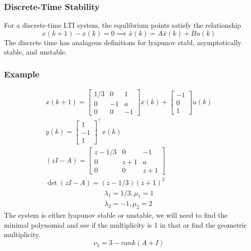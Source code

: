 \documentclass[11pt]{article}
\begin{document}
\subsubsection{Discrete-Time Stability}
For a discrete-time LTI system, the equilibrium points satisfy the relationship
\begin{equation}
  x(k+1) - x(k) = 0 \implies \bar{x}(k) = A\bar{x}(k) + Bu(k)
\end{equation}
The discrete time has analagous definitions for lyapunov stabl, asymptotically stable, and unstable.

\subsubsection{Example}
\begin{align}
  x(k+1) =
  \begin{bmatrix}
     1/3 & 0 & 1 \\
     0 & -1 & a \\
     0 & 0 & -1
  \end{bmatrix}
  x(k) + 
  \begin{bmatrix}
    -1 \\ 0 \\ 1
  \end{bmatrix}
  u(k)
  \\
  y(k) = 
  \begin{bmatrix}
    1 \\ -1 \\ 1
  \end{bmatrix}^\top 
  x(k)
  \\
  (zI - A) = 
  \begin{bmatrix}
    z-1/3 & 0 & -1 \\
    0 & z + 1 & a \\
    0 & 0 & z + 1
  \end{bmatrix}
  \\
  \det (zI-A) = 
  (z-1/3)(z+1)^2
\end{align}
\begin{gather}
  \lambda_1 = 1/3, \mu_1 = 1 \\
  \lambda_2 = -1, \mu_2 = 2
\end{gather}
The system is either lyapunov stable or unstable, we will need to find the minimal polynomial and see if the multiplicity is 1 in that or find the geometric multiplicity.
\begin{equation}
  \nu_2 = 3 - rank(A + I)
\end{equation}
\end{document}
